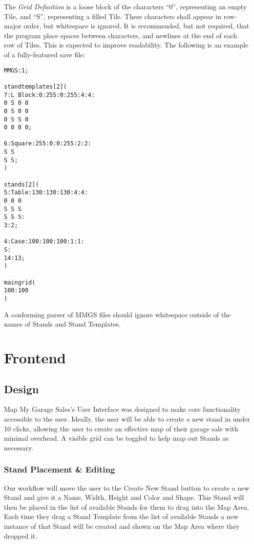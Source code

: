 \documentclass{report}
\begin{document}
The \emph{Grid Definition} is a loose block of the characters ``0'',
representing an empty Tile, and ``S'', representing a filled Tile.
These characters shall appear in row-major order, but whitespace is ignored.
It is recommended, but not required, that the program place spaces between
characters, and newlines at the end of each row of Tiles. This is expected to
improve readability.
\newpage
The following is an example of a fully-featured save file:
\begin{verbatim}
MMGS:1;

standtemplates[2](
7:L Block:0:255:0:255:4:4:
0 S 0 0
0 S 0 0
0 S S 0
0 0 0 0;

6:Square:255:0:0:255:2:2:
S S
S S;
)

stands[2](
5:Table:130:130:130:4:4:
0 0 0
S S S
S S S:
3:2;

4:Case:100:100:100:1:1:
S:
14:13;
)

maingrid(
100:100
)
\end{verbatim}

A conforming parser of MMGS files should ignore whitespace outside of the
names of Stands and Stand Templates.

\chapter{Frontend}

\section{Design}

Map My Garage Sales's User Interface was designed to make core
functionality accessible to the user. Ideally, the user will be able to 
create a new stand in under 10 clicks, allowing the user to create an 
effective map of their garage sale with minimal overhead. A visible grid can be toggled to help
map out Stands as necessary.
\subsection{Stand Placement \& Editing}
Our workflow will move the user to the Create New Stand button to create a new 
Stand and give it a Name, Width, Height and Color and Shape. This Stand will then be placed
in the list of available Stands for them to drag into the Map Area. Each time they 
drag a Stand Template from the list of available Stands a new instance of that Stand 
will be created and shown on the Map Area where they dropped it.
\end{document}
